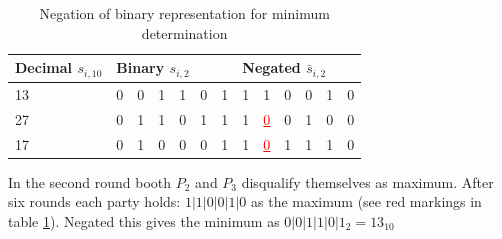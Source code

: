 		\begin{table}[!htb]
			\centering
			\caption{Negation of binary representation for minimum determination} \label{table:secure minimum negation}
			\begin{tabular}{|l|l|l|l|l|l|l|l|l|l|l|l|l|}
				\hline
				Decimal $s_{i,10}$ & \multicolumn{6}{l|}{Binary $s_{i,2}$}  & \multicolumn{6}{l|}{Negated $\bar{s}_{i,2}$} \\ \hline
				13                 & 0    & 0    & 1    & 1    & 0   & 1 & 1    & 1    & 0    & 0    & 1   & 0   \\ \hline
				27                 & 0    & 1    & 1    & 0    & 1   & 1 & 1    & \textcolor{red}{\underline{0}} & 0    & 1    & 0   & 0   \\ \hline
				17                 & 0    & 1    & 0    & 0    & 0   & 1 & 1    & \textcolor{red}{\underline{0}} & 1    & 1    & 1   & 0   \\ \hline
			\end{tabular}
		\end{table}
	
		In the second round booth $P_2$ and $P_3$ disqualify themselves as maximum. After six rounds each party holds: $1|1|0|0|1|0$ as the maximum (see red markings in table \ref{table:secure minimum negation}). Negated this gives the minimum as $0|0|1|1|0|1_2=13_{10}$ 

		\FloatBarrier
		
